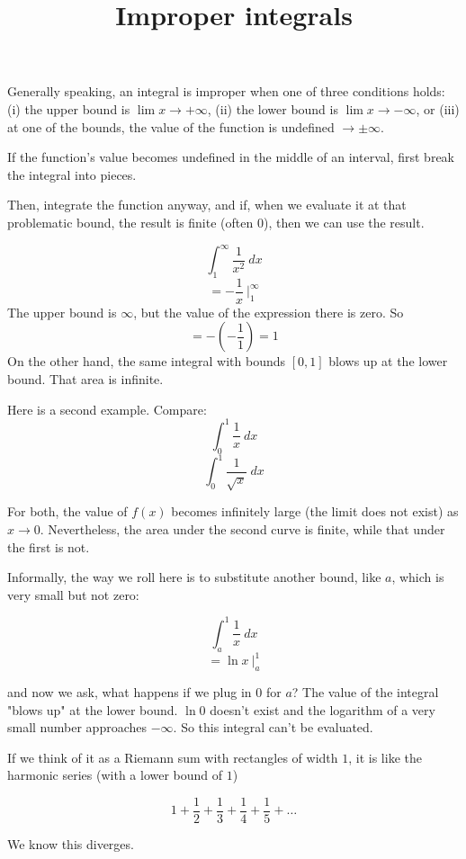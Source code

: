 \documentclass[11pt, oneside]{article}
\title{Improper integrals}
\date{}
\begin{document}
\maketitle
\Large


\label{sec:Improper_integrals}

Generally speaking, an integral is improper when one of three conditions holds:  (i) the upper bound is $\lim x \rightarrow + \infty$, (ii) the lower bound is $\lim x \rightarrow - \infty$, or (iii) at one of the bounds, the value of the function is undefined $\rightarrow \pm \infty$.  

If the function's value becomes undefined in the middle of an interval, first break the integral into pieces.

Then, integrate the function anyway, and if, when we evaluate it at that problematic bound, the result is finite (often $0$), then we can use the result.

\[ \int_1^{\infty} \frac{1}{x^2} \ dx \]
\[ = - \frac{1}{x} \ \bigg |_1^{\infty}  \]
The upper bound is $\infty$, but the value of the expression there is zero.  So
\[ = - (- \frac{1}{1}) = 1  \]
On the other hand, the same integral with bounds $[0,1]$ blows up at the lower bound.  That area is infinite.

Here is a second example.  Compare:
\[ \int_0^1 \frac{1}{x} \ dx \]
\[ \int_0^1 \frac{1}{\sqrt{x}} \ dx \]

For both, the value of $f(x)$ becomes infinitely large (the limit does not exist) as $x \rightarrow 0$.  Nevertheless, the area under the second curve is finite, while that under the first is not.

Informally, the way we roll here is to substitute another bound, like $a$, which is very small but not zero:

\[ \int_a^1 \frac{1}{x} \ dx \]
\[ = \ln x \ \bigg |_a^1 \]
    
and now we ask, what happens if we plug in $0$ for $a$?  The value of the integral "blows up" at the lower bound.  $\ln 0$ doesn't exist and the logarithm of a very small number approaches $- \infty$.  So this integral can't be evaluated.

If we think of it as a Riemann sum with rectangles of width $1$, it is like the harmonic series (with a lower bound of $1$)

\[ 1 + \frac{1}{2} + \frac{1}{3} + \frac{1}{4} + \frac{1}{5} + \dots \]

We know this diverges.
\end{document}
